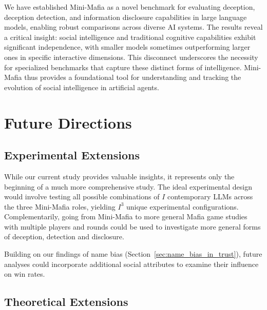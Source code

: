 \documentclass{article}
\begin{document}
We have established Mini-Mafia as a novel benchmark for evaluating deception, deception detection, and information disclosure capabilities in large language models, enabling robust comparisons across diverse AI systems. The results reveal a critical insight: social intelligence and traditional cognitive capabilities exhibit significant independence, with smaller models sometimes outperforming larger ones in specific interactive dimensions. This disconnect underscores the necessity for specialized benchmarks that capture these distinct forms of intelligence. Mini-Mafia thus provides a foundational tool for understanding and tracking the evolution of social intelligence in artificial agents.

\section{Future Directions}
\label{sec:future_directions}

\subsection{Experimental Extensions}

While our current study provides valuable insights, it represents only the beginning of a much more comprehensive study. The ideal experimental design would involve testing all possible combinations of $I$ contemporary LLMs across the three Mini-Mafia roles, yielding $I^3$ unique experimental configurations. Complementarily, going from Mini-Mafia to more general Mafia game studies with multiple players and rounds could be used to investigate more general forms of deception, detection and disclosure.

Building on our findings of name bias (Section~\ref{sec:name_bias_in_trust}), future analyses could incorporate additional social attributes to examine their influence on win rates.

\subsection{Theoretical Extensions}
\label{sec:theoretical_extensions}
\end{document}
